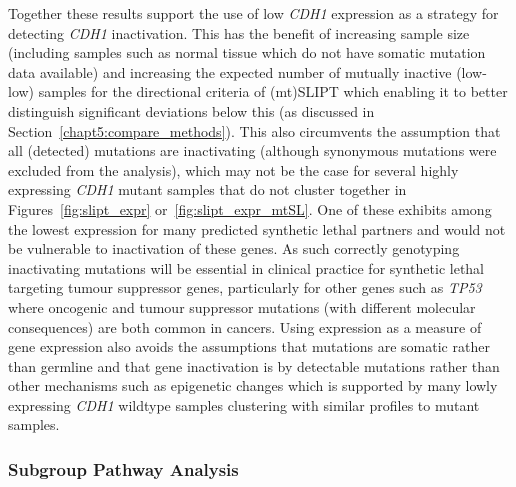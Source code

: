 Together these results support the use of low \textit{CDH1} expression as a strategy for detecting \textit{CDH1} inactivation. This has the benefit of increasing sample size (including samples such as normal tissue which do not have somatic mutation data available) and increasing the expected number of mutually inactive (low-low) samples for the directional criteria of (mt)SLIPT which enabling it to better distinguish significant deviations below this (as discussed in Section~\ref{chapt5:compare_methods}). This also circumvents the assumption that all (detected) mutations are inactivating (although synonymous mutations were excluded from the analysis), which may not be the case for several highly expressing \textit{CDH1} mutant samples that do not cluster together in Figures~\ref{fig:slipt_expr} or~\ref{fig:slipt_expr_mtSL}. One of these exhibits among the lowest expression for many predicted synthetic lethal partners and would not be vulnerable to inactivation of these genes. As such correctly genotyping inactivating mutations will be essential in clinical practice for synthetic lethal targeting tumour suppressor genes, particularly for other genes such as \textit{TP53} where oncogenic and tumour suppressor mutations (with different molecular consequences) are both common in cancers. Using expression as a measure of gene expression also avoids the assumptions that mutations are somatic rather than germline and that gene inactivation is by detectable mutations rather than other mechanisms such as epigenetic changes which is supported by many lowly expressing \textit{CDH1} wildtype samples clustering with similar profiles to mutant samples.



\FloatBarrier

\subsubsection{Subgroup Pathway Analysis}



